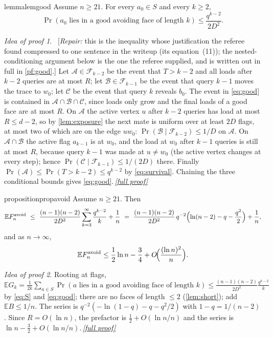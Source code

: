 \documentclass[11pt,a4paper]{article}
\theoremstyle{plain}
\theoremstyle{definition}
\theoremstyle{remark}
\newtheorem*{proofidea}{Idea of proof}
\newcommand{\fullproofref}[1]{\,\hyperref[#1]{\textit{[full proof]}}}
\newcommand{\E}{\mathbb E}
\newcommand{\cF}{\mathcal F}
\newcommand{\Favoid}{F_n^{\mathrm{avoid}}}
\newcommand{\repair}[1]{\ [\textit{Repair:} #1]}
\begin{document}
\begin{restatable}{lemma}{lemgood}\label{lem:good}
Assume $n\ge21$. For every $a_0\in S$ and every $k\ge2$,
\begin{equation}\label{eq:good}
\Pr(a_0\text{ lies in a good avoiding face of length }k)\le\frac{q^{k-2}}{2D^2}.
\end{equation}
\end{restatable}
\begin{proofidea}
\repair{this is the inequality whose justification the referee found compressed to one sentence in the writeup (its equation~(11)); the nested-conditioning argument below is the one the referee supplied, and is written out in full in \cref{pf:good}.} Let $\mathcal A\in\cF_{k-2}$ be the event that $T>k-2$ and all loads after $k-2$ queries are at most $R$; let $\mathcal B\in\cF_{k-1}$ be the event that query $k-1$ moves the trace to $w_0$; let $\mathcal C$ be the event that query $k$ reveals $b_0$. The event in \eqref{eq:good} is contained in $\mathcal A\cap\mathcal B\cap\mathcal C$, since loads only grow and the final loads of a good face are at most $R$. On $\mathcal A$ the active vertex $u$ after $k-2$ queries has load at most $R\le d-2$, so by \cref{lem:exposure} the next mate is uniform over at least $2D$ flags, at most two of which are on the edge $uw_0$: $\Pr(\mathcal B\mid\cF_{k-2})\le1/D$ on $\mathcal A$. On $\mathcal A\cap\mathcal B$ the active flag $a_{k-1}$ is at $w_0$, and the load at $w_0$ after $k-1$ queries is still at most $R$, because query $k-1$ was made at $u\ne w_0$ (the active vertex changes at every step); hence $\Pr(\mathcal C\mid\cF_{k-1})\le1/(2D)$ there. Finally $\Pr(\mathcal A)\le\Pr(T>k-2)\le q^{k-2}$ by \eqref{eq:survival}. Chaining the three conditional bounds gives \eqref{eq:good}.\fullproofref{pf:good}
\end{proofidea}

\begin{restatable}{proposition}{propavoid}\label{prop:avoid}
Assume $n\ge21$. Then
\begin{equation}\label{eq:avoid}
\E\Favoid\ \le\ \frac{(n-1)(n-2)}{2D^2}\sum_{k=3}^\infty\frac{q^{k-2}}k+\frac1n
\ =\ \frac{(n-1)(n-2)}{2D^2}\,q^{-2}\Bigl(\ln(n-2)-q-\frac{q^2}2\Bigr)+\frac1n ,
\end{equation}
and as $n\to\infty$,
\begin{equation}\label{eq:avoid-asymp}
\E\Favoid\le\frac12\ln n-\frac34+O\!\Bigl(\frac{(\ln n)^2}n\Bigr).
\end{equation}
\end{restatable}
\begin{proofidea}
Rooting at flags, $\E G_k=\frac1{2k}\sum_{a\in S}\Pr(a\text{ lies in a good avoiding face of length }k)\le\frac{(n-1)(n-2)}{2D^2}\frac{q^{k-2}}k$ by \eqref{eq:S} and \eqref{eq:good}; there are no faces of length $\le2$ (\cref{lem:short}); add $\E B\le1/n$. The series is $q^{-2}(-\ln(1-q)-q-q^2/2)$ with $1-q=1/(n-2)$. Since $R=O(\ln n)$, the prefactor is $\frac12+O(\ln n/n)$ and the series is $\ln n-\frac32+O(\ln n/n)$.\fullproofref{pf:avoid}
\end{proofidea}
\end{document}
